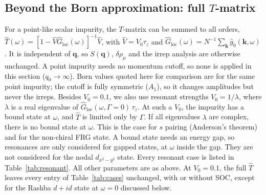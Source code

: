 \documentclass[aps,prb,twocolumn,superscriptaddress,nofootinbib]{revtex4-2}
\newcommand{\bk}{\bm{k}}
\newcommand{\bq}{\bm{q}}
\begin{document}
\subsection{Beyond the Born approximation: full $T$-matrix}
\label{sec:fullT}

For a point-like scalar impurity, the $T$-matrix can be summed to all orders,
$\hat T(\omega) = [1 - \hat V \hat G_{\text{loc}}(\omega)]^{-1} \hat V$, with $\hat V = V_0 \tau_z$ and $\hat G_{\text{loc}}(\omega) = N^{-1} \sum_{\bk} \hat g_0(\bk, \omega)$.
It is independent of $\bq$, so $S(\bq)$, $\delta\rho_\mu$ and the irrep analysis are otherwise unchanged.
A point impurity needs no momentum cutoff, so none is applied in this section ($q_0 \to \infty$).
Born values quoted here for comparison are for the same point impurity; the cutoff is fully symmetric ($A_1$), so it changes amplitudes but never the irreps.
Besides $V_0 = 0.1$, we also use resonant strengths $V_0 = 1/\lambda$, where $\lambda$ is a real eigenvalue of $\hat G_{\text{loc}}(\omega, \Gamma = 0)\, \tau_z$.
At such a $V_0$, the impurity has a bound state at $\omega$, and $\hat T$ is limited only by $\Gamma$.
If all eigenvalues $\lambda$ are complex, there is no bound state at $\omega$.
This is the case for $s$ pairing (Anderson's theorem) and for the non-chiral FRG state.
A bound state needs an energy gap, so resonances are only considered for gapped states, at $\omega$ inside the gap.
They are not considered for the nodal $d_{x^2-y^2}$ state.
Every resonant case is listed in Table~\ref{tab:resonant}.
All other parameters are as above.
At $V_0 = 0.1$, the full $\hat T$ leaves every entry of Table~\ref{tab:cases} unchanged, with or without SOC, except for the Rashba $d+id$ state at $\omega = 0$ discussed below.
\end{document}
